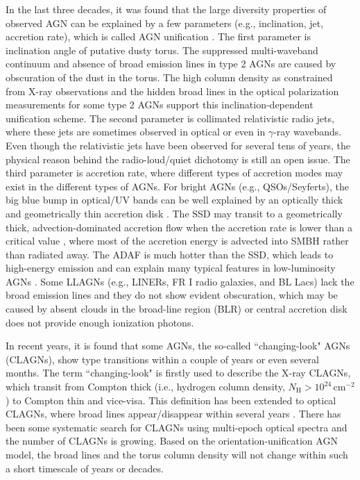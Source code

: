 \documentclass[linenumbers]{aastex631}
\begin{document}
In the last three decades, it was found that the large diversity properties of observed AGN can be explained by a few parameters (e.g., inclination, jet, accretion rate), which is called AGN unification \citep[e.g.,][and references therein]{1993ARA&A..31..473A,2015ARA&A..53..365N}. The first parameter is inclination angle of putative dusty torus. The suppressed multi-waveband continuum and absence of broad emission lines in type 2 AGNs are caused by obscuration of the dust in the torus. The high column density as constrained from X-ray observations and the hidden broad lines in the optical polarization measurements for some type 2 AGNs support this inclination-dependent unification scheme. The second parameter is collimated relativistic radio jets, where these jets are sometimes observed in optical or even in $\gamma$-ray wavebands. Even though the relativistic jets have been observed for several tens of years, the physical reason behind the radio-loud/quiet dichotomy is still an open issue. The third parameter is accretion rate, where different types of accretion modes may exist in the different types of AGNs. For bright AGNs (e.g., QSOs/Seyferts), the big blue bump in optical/UV bands can be well explained by an optically thick and geometrically thin accretion disk \citep[SSD;][]{1973A&A....24..337S}. The SSD may transit to a geometrically thick, advection-dominated accretion flow when the accretion rate is lower than a critical value \citep[ADAF; e.g.,][for a recent review and references therein]{2014ARA&A..52..529Y}, where most of the accretion energy is advected into SMBH rather than radiated away. The ADAF is much hotter than the SSD, which leads to high-energy emission and can explain many typical features in low-luminosity AGNs \citep[LLAGNs,][]{2008ARA&A..46..475H}. Some LLAGNs (e.g., LINERs, FR I radio galaxies, and BL Lacs) lack the broad emission lines and they do not show evident obscuration, which may be caused by absent clouds in the broad-line region (BLR) or central accretion disk does not provide enough ionization photons.  
     

In recent years, it is found that some AGNs, the so-called ``changing-look" AGNs (CLAGNs), show type transitions within a couple of years or even several months. The term ``changing-look" is firstly used to describe the X-ray CLAGNs, which transit from Compton thick (i.e., hydrogen column density, $N_\mathrm{H}> 10^{24}\,\mathrm{cm}^{-2}$) to Compton thin \citep[i.e., $N_\mathrm{H} < 10^{22-23}\,\mathrm{cm}^{-2}$, e.g.,][]{2003MNRAS.342..422M} and vice-visa. This definition has been extended to optical CLAGNs, where broad lines appear/disappear within several years \citep[i.e., transit from type 1 to type 2 and vice-visa, e.g.,][]{2014ApJ...796..134D,2014ApJ...788...48S,2020ApJ...890L..29A,2020ApJ...901....1W}. There has been some systematic search for CLAGNs using multi-epoch optical spectra \citep[e.g.,][]{2018ApJ...862..109Y,2021MNRAS.503.2583S,2021A&A...650A..33P} and the number of CLAGNs is growing. Based on the orientation-unification AGN model, the broad lines and the torus column density will not change within such a short timescale of years or decades.
\end{document}
